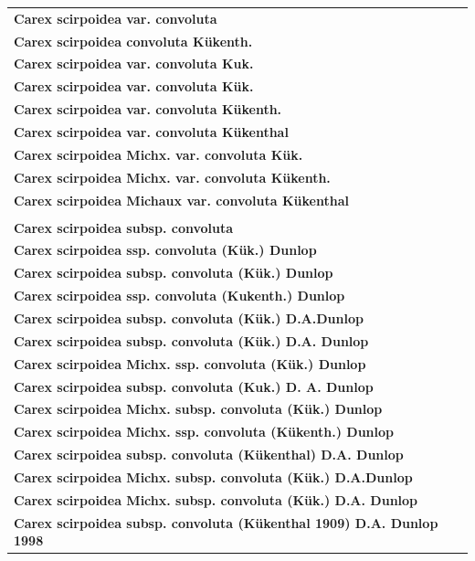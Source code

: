 \documentclass{bmcart}
\begin{document}
\begin{table}[!htb]
\begin{center}
\begin{tabular}{| l | c |}
    \textbf{Carex scirpoidea var. convoluta} & \\
    \textbf{Carex scirpoidea convoluta Kükenth.} & \\
    \textbf{Carex scirpoidea var. convoluta Kuk.} & \\
    \textbf{Carex scirpoidea var. convoluta Kük.} & \\
    \textbf{Carex scirpoidea var. convoluta Kükenth.} & \\
    \textbf{Carex scirpoidea var. convoluta Kükenthal} & \\
    \textbf{Carex scirpoidea Michx. var. convoluta Kük.} & \\
    \textbf{Carex scirpoidea Michx. var. convoluta Kükenth.} & \\
    \textbf{Carex scirpoidea Michaux var. convoluta Kükenthal} & \\
    & \\
    \textbf{Carex scirpoidea subsp. convoluta} & \\
    \textbf{Carex scirpoidea ssp. convoluta (Kük.) Dunlop} & \\
    \textbf{Carex scirpoidea subsp. convoluta (Kük.) Dunlop} & \\
    \textbf{Carex scirpoidea ssp. convoluta (Kukenth.) Dunlop} & \\
    \textbf{Carex scirpoidea subsp. convoluta (Kük.) D.A.Dunlop} & \\
    \textbf{Carex scirpoidea subsp. convoluta (Kük.) D.A. Dunlop} & \\
    \textbf{Carex scirpoidea Michx. ssp. convoluta (Kük.) Dunlop} & \\
    \textbf{Carex scirpoidea subsp. convoluta (Kuk.) D. A. Dunlop} & \\
    \textbf{Carex scirpoidea Michx. subsp. convoluta (Kük.) Dunlop} & \\
    \textbf{Carex scirpoidea Michx. ssp. convoluta (Kükenth.) Dunlop} & \\
    \textbf{Carex scirpoidea subsp. convoluta (Kükenthal) D.A. Dunlop} & \\
    \textbf{Carex scirpoidea Michx. subsp. convoluta (Kük.) D.A.Dunlop} & \\
    \textbf{Carex scirpoidea Michx. subsp. convoluta (Kük.) D.A. Dunlop} & \\
    \textbf{Carex scirpoidea subsp. convoluta (Kükenthal 1909) D.A. Dunlop 1998} & \\
    \hline
    \end{tabular}
  \end{center}
\end{table}
\end{document}
